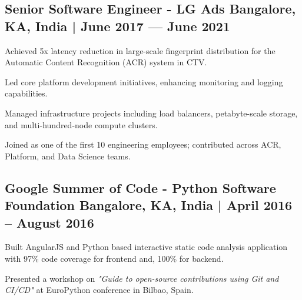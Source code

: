\subsection{{Senior Software Engineer - LG Ads \hfill Bangalore, KA, India | June 2017 --- June 2021}}
\begin{zitemize}
\item Achieved 5x latency reduction in large-scale fingerprint distribution for the Automatic Content Recognition (ACR) system in CTV.
\item Led core platform development initiatives, enhancing monitoring and logging capabilities. 
\item Managed infrastructure projects including load balancers, petabyte-scale storage, and multi-hundred-node compute clusters.
\item Joined as one of the first 10 engineering employees; contributed across ACR, Platform, and Data Science teams.
\end{zitemize}

\subsection{{Google Summer of Code - Python Software Foundation \hfill Bangalore, KA, India | April 2016 -- August 2016}}
\begin{zitemize}
\item Built AngularJS and Python based interactive static code analysis application with 97\% code coverage for frontend and, 100\% for backend.
\item Presented a workshop on \textit{"Guide to open-source contributions using Git and CI/CD"} at EuroPython conference in Bilbao, Spain.
\end{zitemize}